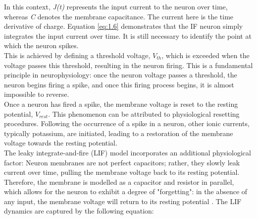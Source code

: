 \noindent In this context, \textit{J(t)} represents the input current to the neuron over time, whereas \textit{C} denotes the membrane capacitance. The current here is the time derivative of charge. Equation \ref{eq:1.6} demonstrates that the IF neuron simply integrates the input current over time. It is still necessary to identify the point at which the neuron spikes. \\

\noindent This is achieved by defining a threshold voltage, $V_{th}$, which is exceeded when the voltage passes this threshold, resulting in the neuron firing. This is a fundamental principle in neurophysiology: once the neuron voltage passes a threshold, the neuron begins firing a spike, and once this firing process begins, it is almost impossible to reverse. \\

\noindent Once a neuron has fired a spike, the membrane voltage is reset to the resting potential, $V_{rest}$. This phenomenon can be attributed to physiological resetting procedures. Following the occurrence of a spike in a neuron, other ionic currents, typically potassium, are initiated, leading to a restoration of the membrane voltage towards the resting potential.\\


\noindent The leaky integrate-and-fire (LIF) model \cite{knight1972dynamics} incorporates an additional physiological factor: Neuron membranes are not perfect capacitors; rather, they slowly leak current over time, pulling the membrane voltage back to its resting potential. Therefore, the membrane is modelled as a capacitor and resistor in parallel, which allows for the neuron to exhibit a degree of "forgetting": in the absence of any input, the membrane voltage will return to its resting potential \cite{koch2004biophysics}. The LIF dynamics are captured by the following equation:

